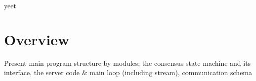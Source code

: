 yeet \cite{yin2019hotstuff}







\section{Overview}
Present main program structure by modules: the consensus state machine and its interface, the server code \& main loop (including stream), communication schema
